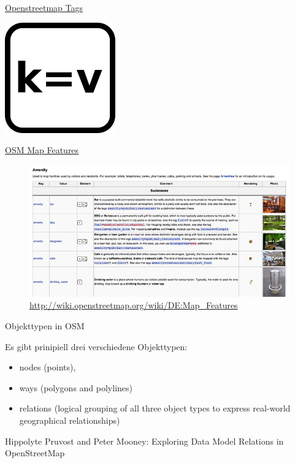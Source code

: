 \documentclass[ignorenonframetext,]{beamer}
\providecommand{\tightlist}{%
  \setlength{\itemsep}{0pt}\setlength{\parskip}{0pt}}
\begin{document}
\begin{frame}{\href{https://wiki.openstreetmap.org/wiki/Tags}{Openstreetmap
Tags}}
\protect\hypertarget{openstreetmap-tags}{}

\includegraphics{figure/osm_tag.png}

\end{frame}

\begin{frame}{\href{http://wiki.openstreetmap.org/wiki/DE:Map_Features}{OSM
Map Features}}
\protect\hypertarget{osm-map-features}{}

\begin{figure}
\centering
\includegraphics{figure/osm_mapfeatures.png}
\caption{\url{http://wiki.openstreetmap.org/wiki/DE:Map_Features}}
\end{figure}

\end{frame}

\begin{frame}{Objekttypen in OSM}
\protect\hypertarget{objekttypen-in-osm}{}

\begin{block}{Es gibt prinipiell drei verschiedene Objekttypen:}

\begin{itemize}
\tightlist
\item
  nodes (points),
\item
  ways (polygons and polylines)
\item
  relations (logical grouping of all three object types to express
  real-world geographical relationships)
\end{itemize}

Hippolyte Pruvost and Peter Mooney: Exploring Data Model Relations in
OpenStreetMap

\end{block}

\end{frame}
\end{document}
